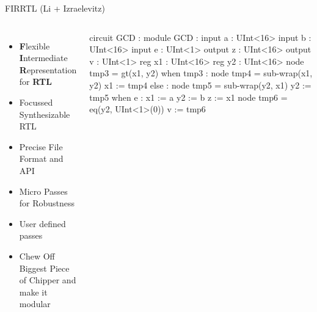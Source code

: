 \documentclass[xcolor=pdflatex,dvipsnames,table]{beamer}
\begin{document}
\begin{frame}[fragile]{FIRRTL (Li + Izraelevitz)}
\begin{columns}
\begin{itemize}
\item {\bf F}lexible {\bf I}ntermediate {\bf R}epresentation for {\bf RTL}
\item Focussed Synthesizable RTL
\item Precise File Format and API
\item Micro Passes for Robustness
\item User defined passes
\item Chew Off Biggest Piece of Chipper and make it modular
\end{itemize}    
{
\begin{stanza}
circuit GCD :
  module GCD :
    input a : UInt<16>
    input b : UInt<16>
    input e : UInt<1>
    output z : UInt<16>
    output v : UInt<1>
    reg x1 : UInt<16>
    reg y2 : UInt<16>
    node tmp3 = gt(x1, y2)
    when tmp3 :
      node tmp4 = sub-wrap(x1, y2)
      x1 := tmp4      
    else :
      node tmp5 = sub-wrap(y2, x1)
      y2 := tmp5
    when e :
      x1 := a
      y2 := b      
    z := x1
    node tmp6 = eq(y2, UInt<1>(0))
    v := tmp6   
\end{stanza}
}
\end{columns}
\end{frame}
\end{document}
